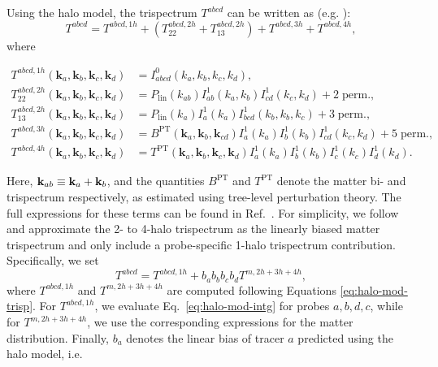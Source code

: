 \documentclass[%
 reprint,
nofootinbib,
 amsmath,amssymb,
 aps,
]{revtex4-1}
\begin{document}
Using the halo model, the trispectrum $T^{abcd}$ can be written as (e.g. \cite{Takada:2013}):
\begin{equation}
T^{abcd} = T^{abcd, 1h} + (T^{abcd, 2h}_{22} + T^{abcd, 2h}_{13}) + T^{abcd, 3h} + T^{abcd, 4h},
\end{equation}
where
\begin{widetext}
\begin{equation}
\begin{aligned}
T^{abcd, 1h}(\mathbf{k}_{a}, \mathbf{k}_{b}, \mathbf{k}_{c}, \mathbf{k}_{d}) &= I^{0}_{abcd}(k_{a}, k_{b}, k_{c}, k_{d}), \\
T^{abcd, 2h}_{22}(\mathbf{k}_{a}, \mathbf{k}_{b}, \mathbf{k}_{c}, \mathbf{k}_{d}) &= P_{\mathrm{lin}}(k_{ab})I^{1}_{ab}(k_{a}, k_{b})I^{1}_{cd}(k_{c}, k_{d}) + 2 \; \mathrm{perm.}, \\
T^{abcd, 2h}_{13}(\mathbf{k}_{a}, \mathbf{k}_{b}, \mathbf{k}_{c}, \mathbf{k}_{d}) &= P_{\mathrm{lin}}(k_{a})I^{1}_{a}(k_{a})I^{1}_{bcd}(k_{b}, k_{b}, k_{c}) + 3 \; \mathrm{perm.}, \\
T^{abcd, 3h}(\mathbf{k}_{a}, \mathbf{k}_{b}, \mathbf{k}_{c}, \mathbf{k}_{d}) &= B^{\mathrm{PT}}(\mathbf{k}_{a}, \mathbf{k}_{b}, \mathbf{k}_{cd})I^{1}_{a}(k_{a})I^{1}_{b}(k_{b})I^{1}_{cd}(k_{c}, k_{d}) + 5 \;\mathrm{perm.},\\
T^{abcd, 4h}(\mathbf{k}_{a}, \mathbf{k}_{b}, \mathbf{k}_{c}, \mathbf{k}_{d}) &= T^{\mathrm{PT}}(\mathbf{k}_{a}, \mathbf{k}_{b}, \mathbf{k}_{c}, \mathbf{k}_{d})I^{1}_{a}(k_{a})I^{1}_{b}(k_{b})I^{1}_{c}(k_{c})I^{1}_{d}(k_{d}).
\label{eq:halo-mod-trisp}
\end{aligned}
\end{equation}
\end{widetext}
Here, ${\bf k}_{ab}\equiv {\bf k}_a+{\bf k}_b$, and the quantities $B^{\mathrm{PT}}$ and $T^{\mathrm{PT}}$ denote the matter bi- and trispectrum respectively, as estimated using tree-level perturbation theory. The full expressions for these terms can be found in Ref.~\cite{Takada:2013}. For simplicity, we follow \cite{Krause:2017} and approximate the 2- to 4-halo trispectrum as the linearly biased matter trispectrum and only include a probe-specific 1-halo trispectrum contribution. Specifically, we set 
\begin{equation}
T^{abcd} = T^{abcd, 1h} + b_{a}b_{b}b_{c}b_{d}T^{m, 2h+3h+4h},
\end{equation}
where $T^{abcd, 1h}$ and $T^{m, 2h+3h+4h}$ are computed following Equations \ref{eq:halo-mod-trisp}. For $T^{abcd, 1h}$, we evaluate Eq.~\ref{eq:halo-mod-intg} for probes $a, b, d, c$, while for $T^{m, 2h+3h+4h}$, we use the corresponding expressions for the matter distribution. Finally, $b_{a}$ denotes the linear bias of tracer $a$ predicted using the halo model, i.e.
\end{document}
